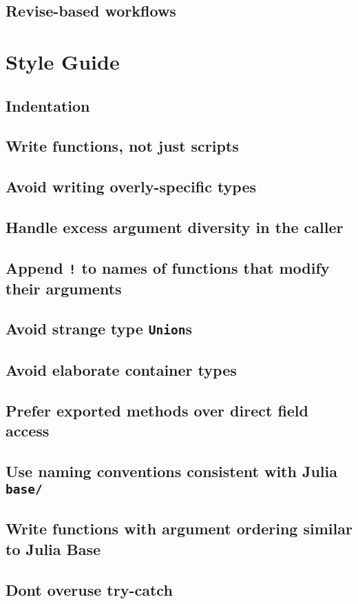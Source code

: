     \section{Revise-based workflows}
  \chapter{Style Guide}
    \section{Indentation}
    \section{Write functions, not just scripts}
    \section{Avoid writing overly-specific types}
    \section{Handle excess argument diversity in the caller}
    \section{Append \texttt{!} to names of functions that modify their arguments}
    \section{Avoid strange type \texttt{Union}s}
    \section{Avoid elaborate container types}
    \section{Prefer exported methods over direct field access}
    \section{Use naming conventions consistent with Julia \texttt{base/}}
    \section{Write functions with argument ordering similar to Julia Base}
    \section{Don{\textquotesingle}t overuse try-catch}
